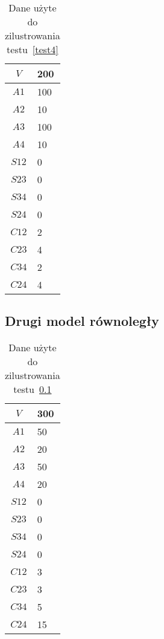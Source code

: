\begin{table}[H]
\centering
\begin{tabular}{|c|l|}
\hline
$V$ & 200 \\ \hline
$A1$ & 100 \\ \hline
$A2$ & 10 \\ \hline
$A3$ & 100 \\ \hline
$A4$ & 10 \\ \hline
$S12$ & 0 \\ \hline
$S23$ & 0 \\ \hline
$S34$ & 0 \\ \hline
$S24$ & 0 \\ \hline
$C12$ & 2 \\ \hline
$C23$ & 4 \\ \hline
$C34$ & 2 \\ \hline
$C24$ & 4 \\ \hline
\end{tabular}
\caption{Dane użyte do zilustrowania testu~\ref{test4}}
\label{tab:res_4}
\end{table}

\subsection{Drugi model równoległy} \label{test5}

\begin{table}[H]
\centering
\begin{tabular}{|c|l|}
\hline
$V$ & 300 \\ \hline
$A1$ & 50 \\ \hline
$A2$ & 20 \\ \hline
$A3$ & 50 \\ \hline
$A4$ & 20 \\ \hline
$S12$ & 0 \\ \hline
$S23$ & 0 \\ \hline
$S34$ & 0 \\ \hline
$S24$ & 0 \\ \hline
$C12$ & 3 \\ \hline
$C23$ & 3 \\ \hline
$C34$ & 5 \\ \hline
$C24$ & 15 \\ \hline
\end{tabular}
\caption{Dane użyte do zilustrowania testu~\ref{test5}}
\label{tab:res_5}
\end{table}
